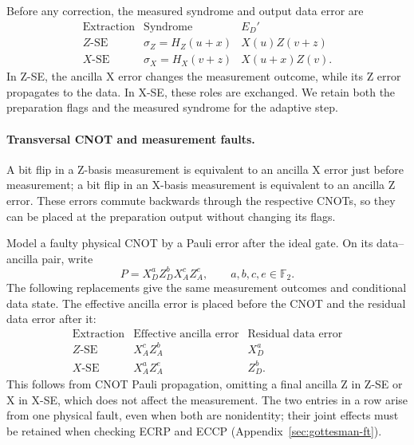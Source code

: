 \documentclass[11pt,a4paper]{article}
\theoremstyle{definition}
\begin{document}
Before any correction, the measured syndrome and output data error are
\begin{equation}
    \begin{array}{c|c|c}
        \text{Extraction} & \text{Syndrome} & E_D' \\
        \hline
        Z\text{-SE} & \sigma_Z=H_Z(u+x) & X(u)Z(v+z) \\
        X\text{-SE} & \sigma_X=H_X(v+z) & X(u+x)Z(v).
    \end{array}
    \label{eq:extraction}
\end{equation}
In Z-SE, the ancilla X error changes the measurement outcome, while its Z error
propagates to the data. In X-SE, these roles are exchanged. We retain
both the preparation flags and the measured syndrome for the adaptive
step.

\paragraph{Transversal CNOT and measurement faults.}
A bit flip in a Z-basis measurement is equivalent to an ancilla X error
just before measurement; a bit flip in an X-basis measurement is
equivalent to an ancilla Z error.
These errors commute backwards through the respective CNOTs, so they can
be placed at the preparation output without changing its flags.

Model a faulty physical CNOT by a Pauli error after the ideal gate. On
its data--ancilla pair, write
\[
    P=X_D^a Z_D^b X_A^c Z_A^e,
    \qquad a,b,c,e\in\mathbb F_2.
\]
The following replacements give the same measurement outcomes and
conditional data state. The effective ancilla error is placed before
the CNOT and the residual data error after it:
\begin{equation}
    \begin{array}{c|c|c}
        \text{Extraction} & \text{Effective ancilla error}
                         & \text{Residual data error} \\
        \hline
        Z\text{-SE} & X_A^c Z_A^b & X_D^a \\
        X\text{-SE} & X_A^a Z_A^e & Z_D^b.
    \end{array}
    \label{eq:coupling-faults}
\end{equation}
This follows from CNOT Pauli propagation, omitting a final ancilla Z in
Z-SE or X in X-SE, which does not affect the measurement. The two entries
in a row arise from one physical fault, even when both are nonidentity;
their joint effects must be retained when checking ECRP and ECCP
(Appendix~\ref{sec:gottesman-ft}).
\end{document}
